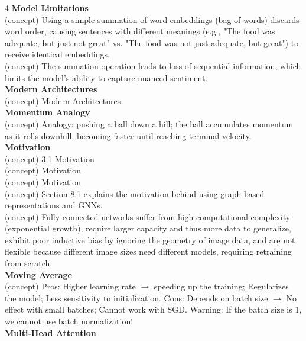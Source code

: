 \documentclass[8pt]{extarticle}
\begin{document}
\begin{multicols}{4}
{\vspace{2pt}\textbf{Model Limitations}\\
(concept) Using a simple summation of word embeddings (bag-of-words) discards word order, causing sentences with different meanings (e.g., "The food was adequate, but just not great" vs. "The food was not just adequate, but great") to receive identical embeddings.\\
(concept) The summation operation leads to loss of sequential information, which limits the model's ability to capture nuanced sentiment.\\
\vspace{2pt}\textbf{Modern Architectures}\\
(concept) Modern Architectures\\
\vspace{2pt}\textbf{Momentum Analogy}\\
(concept) Analogy: pushing a ball down a hill; the ball accumulates momentum as it rolls downhill, becoming faster until reaching terminal velocity.\\
\vspace{2pt}\textbf{Motivation}\\
(concept) 3.1 Motivation\\
(concept) Motivation\\
(concept) Motivation\\
(concept) Section 8.1 explains the motivation behind using graph-based representations and GNNs.\\
(concept) Fully connected networks suffer from high computational complexity (exponential growth), require larger capacity and thus more data to generalize, exhibit poor inductive bias by ignoring the geometry of image data, and are not flexible because different image sizes need different models, requiring retraining from scratch.\\
\vspace{2pt}\textbf{Moving Average}\\
(concept) Pros: Higher learning rate $\rightarrow$ speeding up the training; Regularizes the model; Less sensitivity to initialization. Cons: Depends on batch size $\rightarrow$ No effect with small batches; Cannot work with SGD. Warning: If the batch size is 1, we cannot use batch normalization!\\
\vspace{2pt}\textbf{Multi-Head Attention}\\

}
\end{multicols}
\end{document}
